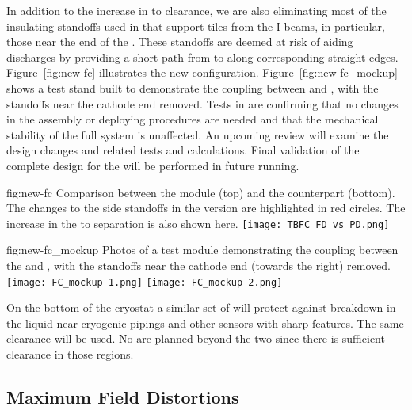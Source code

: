 In addition to the increase in  to  clearance, we are also eliminating most of the insulating standoffs used in  that support  tiles from the  I-beams, in particular, those near the  end of the .  These standoffs  are deemed at risk of aiding discharges by providing a short path from  to  along corresponding straight edges.  Figure~\ref{fig:new-fc} illustrates the new configuration. Figure~\ref{fig:new-fc_mockup} shows a test stand built to demonstrate the coupling between  and , with the standoffs near the cathode end removed. Tests in  are confirming that no changes in the assembly or deploying procedures are needed and that the mechanical stability of the full system is unaffected. An upcoming review will examine the design changes and related tests and calculations. Final validation of the complete  design for the  will be performed in future  running.


\begin{dunefigure}
{fig:new-fc}
{Comparison between the   module (top) and the  counterpart (bottom).  The changes to the  side standoffs in the  version are highlighted in red circles.  The increase in the  to  separation is also shown here.} 
\texttt{[image: TBFC\_FD\_vs\_PD.png]}
\end{dunefigure}

\begin{dunefigure}
{fig:new-fc_mockup}
{Photos of a test module demonstrating the coupling between the   and , with the standoffs near the cathode end (towards the right) removed.} %
\texttt{[image: FC\_mockup-1.png]}
\texttt{[image: FC\_mockup-2.png]}
\end{dunefigure}

On the bottom of the cryostat a similar set of  %
will protect against %
breakdown in the liquid near cryogenic pipings and other sensors with sharp features. The same clearance will be used. No  are planned beyond the two  since there is sufficient clearance in those regions.  


\subsection{Maximum Field Distortions}
\label{sec:fdsp-hv-des-fc-mfd}

